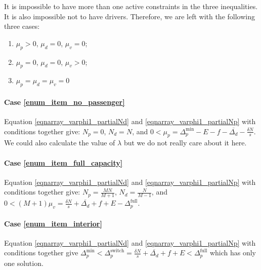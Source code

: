 \documentclass[english, a4paper]{article}
\theoremstyle{plain}
\theoremstyle{definition}
\theoremstyle{remark}
\begin{document}
It is impossible to have more than one active constraints in the three inequalities. It is also impossible not to have drivers. Therefore, we are left with the following three cases:

\begin{enumerate}
    \item \label{enum_item_no_passenger} $\mu_p > 0$, $\mu_d = 0$, $\mu_v = 0$;
    \item \label{enum_item_full_capacity} $\mu_p = 0$, $\mu_d = 0$, $\mu_v > 0$;
    \item \label{enum_item_interior} $\mu_p = \mu_d = \mu_v = 0$
\end{enumerate}

\paragraph{Case \ref{enum_item_no_passenger}} Equation \ref{eqnarray_varphi1_partialNd} and \ref{eqnarray_varphi1_partialNp} with conditions together give: $N_p = 0$, $N_d = N$, and $0 < \mu_p = \Delta_p^{\text{min}} - E - f - \overline{\Delta_d} - \frac{\delta N}{s}$. We could also calculate the value of $\lambda$ but we do not really care about it here.

\paragraph{Case \ref{enum_item_full_capacity}} Equation \ref{eqnarray_varphi1_partialNd} and \ref{eqnarray_varphi1_partialNp} with conditions together give: $N_p = \frac{MN}{M+1}$, $N_d = \frac{N}{M-1}$, and $0 < (M+1)\mu_v = \frac{\delta N}{s} + \overline{\Delta_d} + f + E - \Delta _p^{\text{full}}$.

\paragraph{Case \ref{enum_item_interior}} Equation \ref{eqnarray_varphi1_partialNd} and \ref{eqnarray_varphi1_partialNp} with conditions together give $\Delta_p^{\text{min}} < \Delta_p^{\text{switch}} = \frac{\delta N}{s} + \overline{\Delta_d} + f + E <\Delta_p^{\text{full}}$ which has only one solution.
\end{document}
